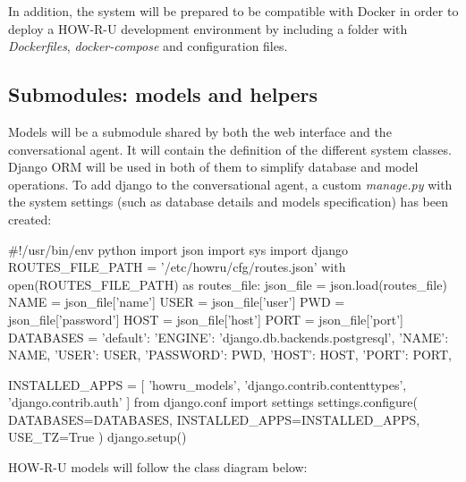 \documentclass[12pt,english]{article}
\begin{document}
In addition, the system will be prepared to be compatible with Docker in order to deploy a HOW-R-U development environment by including a folder with \emph{Dockerfiles}, \emph{docker-compose} and configuration files.
\newpage
\subsection{Submodules: models and helpers}

Models will be a submodule shared by both the web interface and the conversational agent. It will contain the definition of the different system classes. Django ORM will be used in both of them to simplify database and model operations. To add django to the conversational agent, a custom \emph{manage.py} with the system settings (such as database details and models specification) has been created:

  \begin{python}[caption={Custom \emph{manage.py} file to use Django ORM in the agent. Based in \href{https://stackoverflow.com/questions/45595750/use-django-orm-outside-of-django}{https://stackoverflow.com/questions/45595750/use-django-orm-outside-of-django}}, captionpos=b]
  #!/usr/bin/env python
  import json
  import sys
  import django
  ROUTES_FILE_PATH = '/etc/howru/cfg/routes.json'
  with open(ROUTES_FILE_PATH) as routes_file:
    json_file = json.load(routes_file)
    NAME = json_file['name']
    USER = json_file['user']
    PWD = json_file['password']
    HOST = json_file['host']
    PORT = json_file['port']
  DATABASES = {
    'default': {
        'ENGINE': 'django.db.backends.postgresql',
        'NAME': NAME,
        'USER': USER,
        'PASSWORD': PWD,
        'HOST': HOST,
        'PORT': PORT,
    }
  }

  INSTALLED_APPS = [
    'howru_models',
    'django.contrib.contenttypes',
    'django.contrib.auth'
  ]
  from django.conf import settings
  settings.configure(
    DATABASES=DATABASES,
    INSTALLED_APPS=INSTALLED_APPS,
    USE_TZ=True
  )
  django.setup()
  \end{python}

HOW-R-U models will follow the class diagram below:
\end{document}

